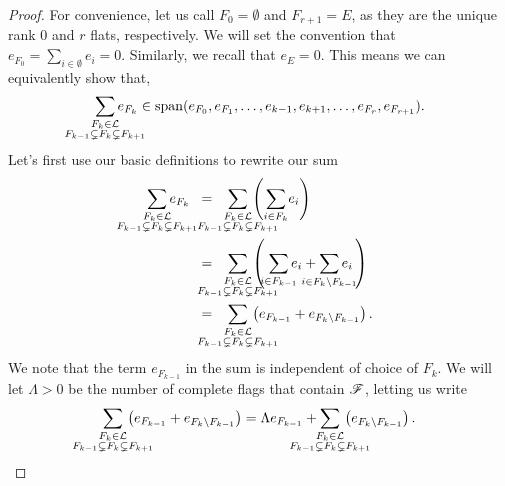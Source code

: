 \documentclass[12pt,oneside]{../../sfsuthesis}
\begin{document}
\begin{proof}
    For convenience, let us call \( F_0 = \emptyset \) and \( F_{r+1} = E \), as they are the unique rank 0 and \( r \) flats, respectively.
    We will set the convention that \( e_{F_0} = \sum_{i \in \emptyset} e_i = 0 \).
    Similarly, we recall that \( e_E = 0 \).
    This means we can equivalently show that,
    \[
        \sum_{\mathclap{\substack{F_k \in \cL \\ F_{k-1} \subsetneq F_k \subsetneq F_{k+1} }}} e_{F_{k}} \in \Span( e_{F_0}, e_{F_1}, \dots, e_{k-1}, e_{k+1}, \dots, e_{F_r}, e_{F_{r+1}} ).
    \]
    Let's first use our basic definitions to rewrite our sum
    \begin{align*}
        \sum_{\mathclap{\substack{F_k \in \cL \\ F_{k-1} \subsetneq F_k \subsetneq F_{k+1} }}} e_{F_{k}}
        \;\; & = \;\;\;
        \sum_{\mathclap{\substack{F_k \in \cL \\ F_{k-1} \subsetneq F_k \subsetneq F_{k+1} }}}\, \left( \, \sum_{\mathclap{ i \in F_k }}e_i \right) \\
             & = \;\;\;
        \sum_{\mathclap{\substack{F_k \in \cL \\ F_{k-1} \subsetneq F_k \subsetneq F_{k+1} }}}\, \left( \; \sum_{\mathclap{ i \in F_{k-1} }}e_i + \sum_{\mathclap{ i \in F_{k} \setminus F_{k-1} }}e_i \, \right) \\
             & = \;\;\;
        \sum_{\mathclap{\substack{F_k \in \cL \\ F_{k-1} \subsetneq F_k \subsetneq F_{k+1} }}}\, \left( e_{F_{k-1}} + e_{F_k \setminus F_{k-1}} \right).
    \end{align*}
    We note that the term \( e_{F_{k-1}}\) in the sum is independent of choice of \( F_k \).
    We will let \( \Lambda > 0 \) be the number of complete flags that contain \( \mathscr{F} \), letting us write
    \[
        \sum_{\mathclap{\substack{F_k \in \cL \\ F_{k-1} \subsetneq F_k \subsetneq F_{k+1} }}}\, \left( e_{F_{k-1}} + e_{F_k \setminus F_{k-1}} \right)
        = \Lambda e_{F_{k-1}} + \sum_{\mathclap{\substack{F_k \in \cL \\ F_{k-1} \subsetneq F_k \subsetneq F_{k+1} }}}\, \left( e_{F_k \setminus F_{k-1}} \right).
    \]


\end{proof}
\end{document}
